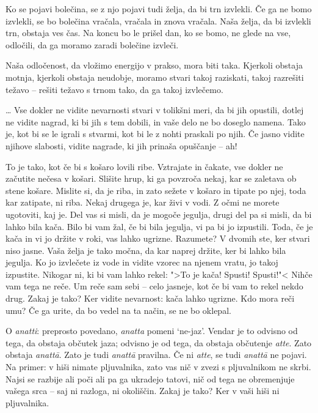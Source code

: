 Ko se pojavi bolečina, se z njo pojavi tudi želja, da bi trn izvlekli. Če ga ne bomo izvlekli, se bo bolečina vračala, vračala in znova vračala. Naša želja, da bi izvlekli trn, obstaja ves čas. Na koncu bo le prišel dan, ko se bomo, ne glede na vse, odločili, da ga moramo zaradi bolečine izvleči.

Naša odločenost, da vložimo energijo v prakso, mora biti taka. Kjerkoli obstaja motnja, kjerkoli obstaja neudobje, moramo stvari takoj raziskati, takoj razrešiti težavo – rešiti težavo s trnom tako, da ga takoj izvlečemo.

\clearpage


\ldots{} Vse dokler ne vidite nevarnosti stvari v tolikšni meri, da bi jih opustili, dotlej ne vidite nagrad, ki bi jih s tem dobili, in vaše delo ne bo doseglo namena. Tako je, kot bi se le igrali s stvarmi, kot bi le z nohti praskali po njih. Če jasno vidite njihove slabosti, vidite nagrade, ki jih prinaša opuščanje – ah!

To je tako, kot če bi s košaro lovili ribe. Vztrajate in čakate, vse dokler ne začutite nečesa v košari. Slišite hrup, ki ga povzroča nekaj, kar se zaletava ob stene košare. Mislite si, da je riba, in zato sežete v košaro in tipate po njej, toda kar zatipate, ni riba. Nekaj drugega je, kar živi v vodi. Z očmi ne morete ugotoviti, kaj je. Del vas si misli, da je mogoče jegulja, drugi del pa si misli, da bi lahko bila kača. Bilo bi vam žal, če bi bila jegulja, vi pa bi jo izpustili. Toda, če je kača in vi jo držite v roki, vas lahko ugrizne. Razumete? V dvomih ste, ker stvari niso jasne. Vaša želja je tako močna, da kar naprej držite, ker bi lahko bila jegulja. Ko jo izvlečete iz vode in vidite vzorec na njenem vratu, jo takoj izpustite. Nikogar ni, ki bi vam lahko rekel: ">To je kača! Spusti! Spusti!"< Nihče vam tega ne reče. Um reče sam sebi – celo jasneje, kot če bi vam to rekel nekdo drug. Zakaj je tako? Ker vidite nevarnost: kača lahko ugrizne. Kdo mora reči umu? Če ga urite, da bo vedel na ta način, se ne bo oklepal.

\clearpage


O \emph{anatti}: preprosto povedano, \emph{anatta} pomeni `ne-jaz'. Vendar je to odvisno od tega, da obstaja občutek jaza; odvisno je od tega, da obstaja občutenje \emph{atte}. Zato obstaja \emph{anattā}. Zato je tudi \emph{anattā} pravilna. Če ni \emph{atte}, se tudi \emph{anattā} ne pojavi. Na primer: v hiši nimate pljuvalnika, zato vas nič v zvezi s pljuvalnikom ne skrbi. Najsi se razbije ali poči ali pa ga ukradejo tatovi, nič od tega ne obremenjuje vašega srca – saj ni razloga, ni okoliščin. Zakaj je tako? Ker v vaši hiši ni pljuvalnika.

